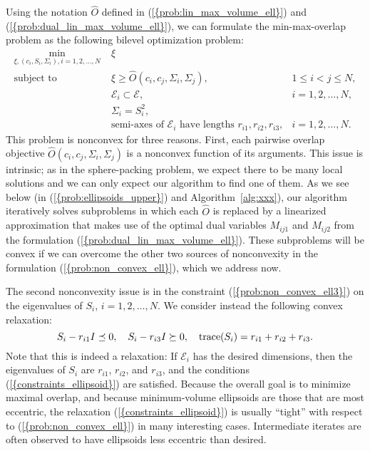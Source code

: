 \documentclass{siamltex}
\begin{document}
Using the notation $\hat{O}$ defined in
{(\ref{{prob:lin_max_volume_ell}})} and
{(\ref{{prob:dual_lin_max_volume_ell}})}, we can formulate the
min-max-overlap problem as the following bilevel optimization problem:
\begin{subequations}
\label{prob:non_convex_ell}
\begin{align}
\min_{\xi, (c_i,S_i,\Sigma_i), i=1,2,\dotsc,N} \;&
\xi&\\
\mbox{subject to} \quad&\xi \geq \hat{O}(c_i, c_j, \Sigma_i, \Sigma_j),& 1\leq i<j\leq N, \label{prob:non_convex_ell1}\\ 
\label{prob:non_convex_ell2} &\mathcal{E}_i\subset \mathcal{E}, & i=1,2,\dots,N, \\ 
\label{prob:non_convex_ell4} &\Sigma_i=S_i^2, \\
\label{prob:non_convex_ell3} &\mbox{semi-axes of }\mathcal{E}_i \mbox{ have lengths } r_{i1}, r_{i2}, r_{i3},  & i=1,2,\dots,N.
\end{align}
\end{subequations}
This problem is nonconvex for three reasons. First, each pairwise
overlap objective $\hat{O}(c_i,c_j,\Sigma_i,\Sigma_j)$ is a nonconvex
function of its arguments. 
This issue is intrinsic; as in the sphere-packing problem, we expect
there to be many local solutions and we can only expect our algorithm
to find one of them. As we see below (in {(\ref{{prob:ellipsoids_upper}})}
and Algorithm~\ref{alg:xxx}), our algorithm iteratively solves
subproblems in which each $\hat{O}$ is replaced by a linearized
approximation that makes use of the optimal dual variables $M_{ij1}$ and
$M_{ij2}$ from the formulation {(\ref{{prob:dual_lin_max_volume_ell}})}.
These subproblems will be convex if we can overcome the other two
sources of nonconvexity in the formulation
{(\ref{{prob:non_convex_ell}})}, which we address now.

The second nonconvexity issue is in the constraint
{(\ref{{prob:non_convex_ell3}})} on the eigenvalues of $S_i$,
$i=1,2,\dotsc,N$. We consider instead the following convex relaxation:
\begin{equation}
\label{constraints_ellipsoid}
S_i-r_{i1} I\preceq 0, \quad S_i-r_{i3} I\succeq 0, \quad 
{\mbox{\rm trace}}(S_i)=r_{i1}+r_{i2}+r_{i3}.
\end{equation}
Note that this is indeed a relaxation: If $\mathcal{E}_i$ has the
desired dimensions, then the eigenvalues of $S_i$ are $r_{i1}$,
$r_{i2}$, and $r_{i3}$, and the conditions
{(\ref{{constraints_ellipsoid}})} are satisfied.  Because the overall
goal is to minimize maximal overlap, and because minimum-volume
ellipsoids are those that are most eccentric, the relaxation
{(\ref{{constraints_ellipsoid}})} is usually ``tight'' with respect to
{(\ref{{prob:non_convex_ell}})} in many interesting cases.
Intermediate iterates are often observed to have ellipsoids less
eccentric than desired.
\end{document}
